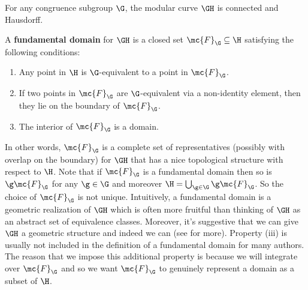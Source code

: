       \begin{proposition}\label{prop:modular_curves_topological_properties}
        For any congruence subgroup $\G$, the modular curve $\GH$ is connected and Hausdorff.
      \end{proposition}

      A \textbf{fundamental domain} for $\GH$ is a closed set $\mc{F}_{\G} \subseteq \H$ satisfying the following conditions:
      \begin{enumerate}[label=(\roman*)]
        \item Any point in $\H$ is $\G$-equivalent to a point in $\mc{F}_{\G}$.
        \item If two points in $\mc{F}_{\G}$ are $\G$-equivalent via a non-identity element, then they lie on the boundary of $\mc{F}_{\G}$.
        \item The interior of $\mc{F}_{\G}$ is a domain.
      \end{enumerate}
      In other words, $\mc{F}_{\G}$ is a complete set of representatives (possibly with overlap on the boundary) for $\GH$ that has a nice topological structure with respect to $\H$. Note that if $\mc{F}_{\G}$ is a fundamental domain then so is $\g\mc{F}_{\G}$ for any $\g \in \G$ and moreover $\H = \bigcup_{\g \in \G}\g\mc{F}_{\G}$. So the choice of $\mc{F}_{\G}$ is not unique. Intuitively, a fundamental domain is a geometric realization of $\GH$ which is often more fruitful than thinking of $\GH$ as an abstract set of equivalence classes. Moreover, it's suggestive that we can give $\GH$ a geometric structure and indeed we can (see \cite{diamond2005first} for more). Property (iii) is usually not included in the definition of a fundamental domain for many authors. The reason that we impose this additional property is because we will integrate over $\mc{F}_{\G}$ and so we want $\mc{F}_{\G}$ to genuinely represent a domain as a subset of $\H$.

